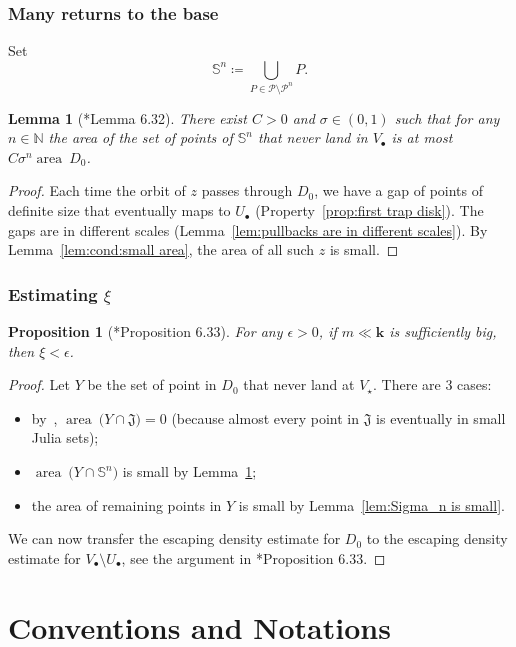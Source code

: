 \documentclass{amsart}
\newcommand{\1}{{\mathbb 1 }}
\newcommand\mbbS{{\mathbb S}}
\newcommand\Jul{{\mathfrak J}}
\newcommand{\bbk}{{\mathbf k}}
\newcommand{\str}{{\star}}
\newcommand\scrP{\mathscr{P}}
\newcommand{\N}{\mathbb{N}}
\newtheorem{lem}[thm]{Lemma}
\newtheorem{prop}[thm]{Proposition}
\theoremstyle{remark}
\numberwithin{equation}{section}
\theoremstyle{definition}
\newcommand{\area}{{\operatorname{area}\ }}
\theoremstyle{nonumberbreak}
\begin{document}
\subsubsection{Many returns to the base}
Set
\[\mbbS^n \coloneqq\bigcup_{P\in \scrP\setminus \scrP^n} P.\]
\begin{lem}[\cite{AL-posmeas}*{Lemma 6.32}]
\label{lem:mbbS is small}
There exist $C > 0$ and $\sigma\in (0, 1) $ such that for any $n\in \N$ the area of the set of points of $\mbbS^n$ that never land in $V_\bullet$ is at
most $C\sigma ^n\area D_0$.
\end{lem} 
\begin{proof}
Each time the orbit of $z$ passes through $D_0$, we have a gap of points of definite size that eventually maps to $U_\bullet$ (Property~\ref{prop:first trap disk}). The gaps are in different scales (Lemma~\ref{lem:pullbacks are in different scales}). By Lemma~\ref{lem:cond:small area}, the area of all such $z$ is small.
\end{proof}

\subsubsection{Estimating $\xi$}

\begin{prop}[\cite{AL-posmeas}*{Proposition 6.33}]
For any $\epsilon>0$, if $m\ll\bbk$ is sufficiently big, then $\xi< \epsilon$.
\end{prop}
\begin{proof}
Let $Y$ be the set of point in $D_0$ that never land at $V_\str$. There are $3$ cases:
\begin{itemize}
\item by~\cite{L:TypBeh}, $\area \big(Y\cap \Jul\big)=0$ (because almost every point in $\Jul$ is eventually in small Julia sets); 
\item   $\area \big(Y\cap  \mbbS^n\big)$ is small by Lemma~\ref{lem:mbbS is small};
\item the area of remaining points in $Y$ is small by Lemma~\ref{lem:Sigma_n is small}.
\end{itemize}

We can now transfer the escaping density estimate for $D_0$ to the escaping density estimate for $V_\bullet\setminus U_\bullet$, see the argument in \cite{AL-posmeas}*{Proposition 6.33}. 
\end{proof}


\section*{Conventions and Notations}
\end{document}
